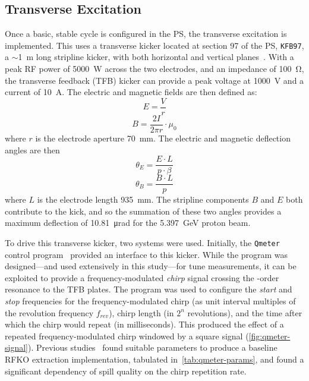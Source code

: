 \documentclass[a4paper,twoside,11pt]{report}
\begin{document}
\subsection{Transverse Excitation}\label{sec:trans_exc}
Once a basic, stable cycle is configured in the PS, the transverse excitation is implemented. This uses a transverse kicker located at section 97 of the PS, \verb|KFB97|, a $\sim$\qty{1}{\meter} long stripline kicker, with both horizontal and vertical planes~\cite{Sterbini:2158994}. With a peak RF power of \qty{5000}{\watt} across the two electrodes, and an impedance of \qty{100}{\ohm}, the transverse feedback (TFB) kicker can provide a peak voltage at \qty{1000}{\volt} and a current of \qty{10}{\ampere}. The electric and magnetic fields are then defined as:
\begin{equation}
  E=\frac Vr
\end{equation}
\begin{equation}
  B=\frac {2I}{2\pi r}\cdot \mu_0
\end{equation}
where $r$ is the electrode aperture \qty{70}{\milli\meter}. The electric and magnetic deflection angles are then~\cite[3.1-3.2]{bouvet}
\begin{equation}
  \theta_E = \frac{E \cdot L}{p\cdot\beta}
  \label{eq:kick-electric}
\end{equation}
\begin{equation}
  \theta_B = \frac{B\cdot L}{p}
  \label{eq:kick-magnetic}
\end{equation} where $L$ is the electrode length \qty{935}{\milli\meter}. The stripline components $B$ and $E$ both contribute to the kick, and so the summation of these two angles provides a maximum deflection of \qty{10.81}{\micro\radian} for the \qty{5.397}{\giga\electronvolt} proton beam.

To drive this transverse kicker, two systems were used. Initially, the \verb|Qmeter| control program~\cite{Gasior:895142} provided an interface to this kicker. While the program was designed---and used extensively in this study---for tune measurements, it can be exploited to provide a frequency-modulated \textit{chirp} signal crossing the -order resonance to the TFB plates. The program was used to configure the \textit{start} and \textit{stop} frequencies for the frequency-modulated chirp (as unit interval multiples of the revolution frequency $f_{rev}$), chirp length (in $2^n$ revolutions), and the time after which the chirp would repeat (in milliseconds). This produced the effect of a repeated frequency-modulated chirp windowed by a square signal (\autoref{fig:qmeter-signal}). Previous studies~\cite{ipac} found suitable parameters to produce a baseline RFKO extraction implementation, tabulated in~\autoref{tab:qmeter-params}, and found a significant dependency of spill quality on the chirp repetition rate.
\end{document}
